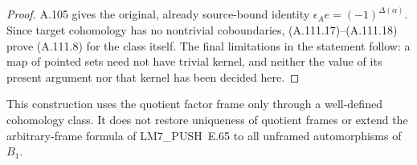 \begin{proof}
A.105 gives the original, already source-bound identity
\(\epsilon_Ae=(-1)^{\Delta(\alpha)}\). Since target cohomology
has no nontrivial coboundaries, (A.111.17)--(A.111.18) prove
(A.111.8) for the class itself. The final limitations in the
statement follow: a map of pointed sets need not have trivial
kernel, and neither the value of its present argument nor
that kernel has been decided here.
\end{proof}

This construction uses the quotient factor frame only through a
well-defined cohomology class. It does not restore uniqueness of
quotient frames or extend the arbitrary-frame formula of
LM7\_PUSH~E.65 to all unframed automorphisms of \(B_1\).
